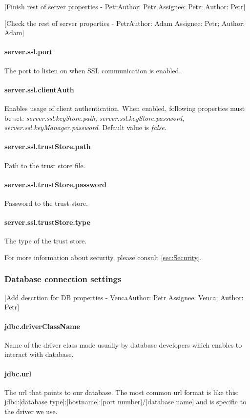 \documentclass[12pt,a4paper]{report}
\makeatletter
\newcommand{\comment}[3][\@empty]{
  {\color{magenta}[#3 - }
  {\color{green}\ifx\@empty#1\relax Author: #2 \else Assignee: #1; Author: #2\fi}{\color{magenta}]}
}
\makeatother
\begin{document}
\comment[Petr]{Petr}{Finish rest of server properties}
\comment[Petr]{Adam}{Check the rest of server properties}
\paragraph{server.ssl.port}
The port to listen on when SSL communication is enabled.

\paragraph{server.ssl.clientAuth}
Enables usage of client authentication. When enabled, following properties must
be set: \emph{server.ssl.keyStore.path}, \emph{server.ssl.keyStore.password},
\emph{server.ssl.keyManager.password}. Default value is \emph{false}.

\paragraph{server.ssl.trustStore.path}
Path to the trust store file.

\paragraph{server.ssl.trustStore.password}
Password to the trust store.

\paragraph{server.ssl.trustStore.type}
The type of the trust store.

\vspace{0.75cm}
For more information about security, please consult \ref{sec:Security}.

\subsubsection{Database connection settings}
\comment[Venca]{Petr}{Add descrtion for DB properties}
\paragraph{jdbc.driverClassName}
Name of the driver class made usually by database developers which enables to interact with database.

\paragraph{jdbc.url}
 The url that points to our database. The most common url format is like this:
jdbc:[database type]:[hostname]:[port number]/[database name]
and is specific to the driver we use.
\end{document}
